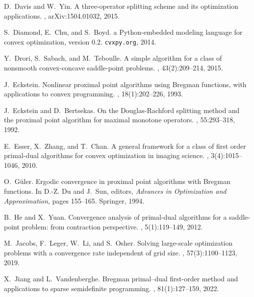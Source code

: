 \documentclass[letterpaper,11pt]{article}
\begin{document}
\begin{thebibliography}{10}
D.~Davis and W.~Yin.
\newblock A three-operator splitting scheme and its optimization applications.
, arXiv:1504.01032, 2015.

S.~Diamond, E.~Chu, and S.~Boyd.
 a {P}ython-embedded modeling language for convex
  optimization, version 0.2.
\newblock \texttt{cvxpy.org}, 2014.

Y.~Drori, S.~Sabach, and M.~Teboulle.
\newblock A simple algorithm for a class of nonsmooth convex-concave
  saddle-point problems.
, 43(2):209--214, 2015.

J.~Eckstein.
\newblock Nonlinear proximal point algorithms using {B}regman functions, with
  applications to convex programming.
, 18(1):202--226, 1993.

J.~Eckstein and D.~Bertsekas.
\newblock On the {D}ouglas-{R}achford splitting method and the proximal point
  algorithm for maximal monotone operators.
, 55:293--318, 1992.

E.~Esser, X.~Zhang, and T.~Chan.
\newblock A general framework for a class of first order primal-dual algorithms
  for convex optimization in imaging science.
, 3(4):1015--1046, 2010.

O.~G{\"u}ler.
\newblock Ergodic convergence in proximal point algorithms with {B}regman
  functions.
\newblock In D.-Z. Du and J.~Sun, editors, {\em Advances in Optimization and
  Approximation}, pages 155--165. Springer, 1994.

B.~He and X.~Yuan.
\newblock Convergence analysis of primal-dual algorithms for a saddle-point
  problem: from contraction perspective.
, 5(1):119--149, 2012.

M.~Jacobs, F.~Leger, W.~Li, and S.~Osher.
\newblock Solving large-scale optimization problems with a convergence rate
  independent of grid size.
, 57(3):1100--1123, 2019.

X.~Jiang and L.~Vandenberghe.
\newblock Bregman primal--dual first-order method and applications to sparse
  semidefinite programming.
, 81(1):127--159,
  2022.


\end{thebibliography}
\end{document}
